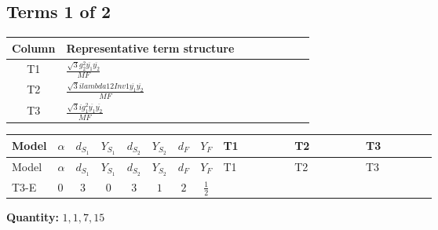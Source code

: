 \documentclass[8pt]{article}
\begin{document}
\begin{landscape}
\subsection*{Terms 1 of 2}
\begin{center}
\begin{tabular}{@{}c >{\raggedright\arraybackslash}p{0.82\linewidth}@{}}
\toprule
Column & Representative term structure \\
\midrule
T1 & \(\displaystyle \frac{\sqrt{3} g_{2}^{2} \overline{y_{1}} \overline{y_{2}}}{MF}\) \\
\midrule
T2 & \(\displaystyle \frac{\sqrt{3} i lambda12Inv1 \overline{y_{1}} \overline{y_{2}}}{MF}\) \\
\midrule
T3 & \(\displaystyle \frac{\sqrt{3} i g_{1}^{2} \overline{y_{1}} \overline{y_{2}}}{MF}\) \\
\midrule
\bottomrule
\end{tabular}
\end{center}
\smallskip
\tiny
\begin{longtable}{@{}llcccccc >{\raggedright\arraybackslash}p{0.21\linewidth} >{\raggedright\arraybackslash}p{0.21\linewidth} >{\raggedright\arraybackslash}p{0.21\linewidth}@{}}
\toprule
Model & $\alpha$ & $d_{S_1}$ & $Y_{S_1}$ & $d_{S_2}$ & $Y_{S_2}$ & $d_F$ & $Y_F$ & T1 & T2 & T3 \\
\midrule
\endfirsthead
\toprule
Model & $\alpha$ & $d_{S_1}$ & $Y_{S_1}$ & $d_{S_2}$ & $Y_{S_2}$ & $d_F$ & $Y_F$ & T1 & T2 & T3 \\
\midrule
\endhead
T3-E & $0$ & $3$ & $0$ & $3$ & $1$ & $2$ & $\frac{1}{2}$ & \scriptsize\adjustbox{max width=\linewidth}{$\begin{gathered} \frac{\sqrt{3} g_{2}^{2} \overline{y_{1}} \overline{y_{2}}}{6 MF}\end{gathered}$} & \scriptsize\adjustbox{max width=\linewidth}{$\begin{gathered} - \frac{\sqrt{3} i lambda12Inv1 \overline{y_{1}} \overline{y_{2}}}{6 MF}\end{gathered}$} & \scriptsize\adjustbox{max width=\linewidth}{$\begin{gathered} \frac{\sqrt{3} i g_{1}^{2} \overline{y_{1}} \overline{y_{2}}}{8 MF}\end{gathered}$} \\
\midrule
\bottomrule
\end{longtable}
\clearpage
\noindent\textbf{Quantity: }$\mathrm{1,1,7,15}$\par\smallskip

\end{landscape}
\end{document}
